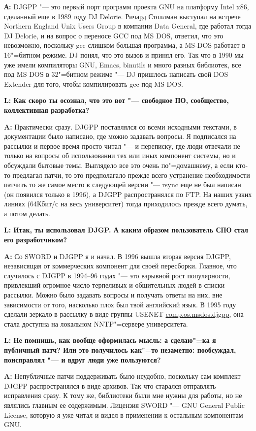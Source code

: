 \documentclass[10pt, a5paper]{article}
\begin{document}
{\noindent \bf А:}  DJGPP "--- это первый порт программ проекта GNU на
платформу Intel x86, сделанный еще в 1989 году DJ Delorie. Ричард Столлман
выступал на встрече Northern England Unix Users Group в компании Data General,
где работал тогда DJ Delorie, и на вопрос о переносе GCC под MS DOS, ответил,
что это невозможно, поскольку gcc слишком большая программа, а MS-DOS работает
в 16"=битном режиме. DJ понял, что это вызов и принял его. Так что в 1990 мы
уже имели компиляторы GNU, Emacs, binutils и много разных библиотек, все под
MS DOS в 32"=битном режиме "--- DJ пришлось написать свой DOS Extender для
того, чтобы компилировать gcc под MS DOS.

{\noindent \bf L: Как скоро ты осознал, что это вот "--- свободное ПО, сообщество, коллективная разработка?}

{\noindent \bf A:} Практически сразу. DJGPP поставлялся со всеми исходными текстами, в документации было
написано, где можно задавать вопросы. Я подписался на рассылки и первое время просто читал "--- и переписку,
где люди отвечали не только на вопросы об использовании тех или иных компонент системы, но и обсуждали бытовые
темы. Выглядело все это очень по"=домашнему, а если кто-то предлагал патчи, то это предполагало прежде всего
устранение необходимости патчить то же самое место в следующей версии "--- rsync еще не был написан (он появился
только в 1996), а DJGPP распространялся по FTP. На наших узких линиях (64Кбит/с на весь университет) тогда
приходилось прежде всего думать, а потом делать.

{\noindent \bf L: Итак, ты использовал DJGP. А каким образом пользователь СПО стал его разработчиком?}

{\noindent \bf A:} Со SWORD и DJGPP я и начал. В 1996 вышла вторая версия DJGPP, независящая от
коммерческих компонент для своей пересборки. Главное, что случилось с DJGPP в
1994--96 годах "--- это взрывной рост популярности, привлекший огромное число
терпеливых и общительных людей в списки рассылки. Можно было задавать вопросы и
получать ответы на них, вне зависимости от того, насколько плох был твой
английский язык. В 1995 году сделали зеркало в рассылку в виде группы USENET
\url{comp.os.msdos.djgpp}, она стала доступна на локальном NNTP"=сервере университета.

{\noindent \bf L: Не помнишь, как вообще оформилась мысль: а сделаю"=ка я
публичный патч? Или это получилось как"=то незаметно: пообсуждал, поисправлял
"--- и вдруг люди уже пользуются?}

{\noindent \bf A:} Непубличные патчи поддерживать было неудобно, поскольку сам комплект
DJGPP распространялся в виде архивов. Так что старался отправлять исправления сразу.
К тому же, библиотеки были мне нужны для работы, но не являлись главным ее содержимым.
Лицензия SWORD "--- GNU General Public License, которую я уже читал и видел в применении
к остальным компонентам GNU. 
\end{document}
